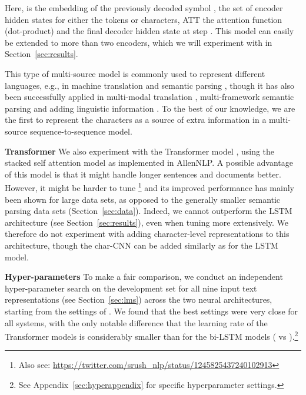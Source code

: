 \documentclass[11pt,a4paper]{article}
\newcommand{\inlineheader}[1]{\vspace{0.06cm}
\noindent\textbf{#1}\quad
}
\begin{document}
\vspace{-0.4cm}

\vspace{-0.4cm}

Here,  is the embedding of the previously decoded symbol ,   the set of encoder hidden states for either the tokens or characters, ATT the attention function (dot-product) and  the final decoder hidden state at step . This model can easily be extended to more than two encoders, which we will experiment with in Section~\ref{sec:results}.

This type of multi-source model is commonly used to represent different languages, e.g., in machine translation \citep{zoph:16,firat-etal-2016-multi} and semantic parsing \citep{susanto2017neural, duong2017multilingual}, though it has also been successfully applied in multi-modal translation \citep{libovicky-helcl-2017-attention}, multi-framework semantic parsing \citep{stanovsky-dagan-2018-semantics} and adding linguistic information \citep{currey:18, van-noord-etal-2019-linguistic}. To the best of our knowledge, we are the first to represent the characters as a source of extra information in a multi-source sequence-to-sequence model.

\inlineheader{Transformer} We also experiment with the Transformer model \citep{transformer:17}, using the stacked self attention model as implemented in AllenNLP. A possible advantage of this model is that it might handle longer sentences and documents better. However, it might be harder to tune \citep{popel2018training}\footnote{Also see: \url{https://twitter.com/srush_nlp/status/1245825437240102913}} and its improved performance has mainly been shown for large data sets, as opposed to the generally smaller semantic parsing data sets (Section~\ref{sec:data}). Indeed, we cannot outperform the LSTM architecture (see Section~\ref{sec:results}), even when tuning more extensively. We therefore do not experiment with adding character-level representations to this architecture, though the char-CNN can be added similarly as for the LSTM model.

\inlineheader{Hyper-parameters} To make a fair comparison, we conduct an independent hyper-parameter search on the development set for all nine input text representations (see Section~\ref{sec:lms}) across the two neural architectures, starting from the settings of \citet{van-noord-etal-2019-linguistic}. We found that the best settings were very close for all systems, with the only notable difference that the learning rate of the Transformer models is considerably smaller than for the bi-LSTM models ( vs ).\footnote{See Appendix~\ref{sec:hyperappendix} for specific hyperparameter settings.}
\end{document}
